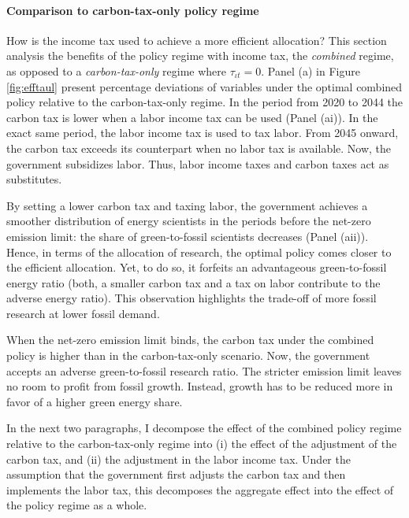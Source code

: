 \paragraph{Comparison to carbon-tax-only policy regime}
How is the income tax used to achieve a more efficient allocation?
This section analysis the benefits of the policy regime with income tax, the \textit{combined} regime, as opposed to a \textit{carbon-tax-only} regime where $\tau_{\iota t}=0$.  
Panel (a)  in Figure \ref{fig:efftaul} present percentage deviations of variables under the optimal combined policy relative to the carbon-tax-only regime. In the period from 2020 to 2044 the carbon tax is lower when a labor income tax can be used (Panel (ai)). In the exact same period, the labor income tax is used to tax labor. From 2045 onward, the carbon tax exceeds its counterpart when no labor tax is available. Now, the government subsidizes labor. Thus, labor income taxes and carbon taxes act as substitutes.

By setting a lower carbon tax and taxing labor, the government achieves a smoother distribution of energy scientists in the periods before the net-zero emission limit: the share of green-to-fossil scientists decreases (Panel (aii)). 
Hence, in terms of the allocation of research, the optimal policy comes closer to the efficient allocation. Yet, to do so, it forfeits an advantageous green-to-fossil energy ratio (both, a smaller carbon tax and a tax on labor contribute to the adverse energy ratio). This observation highlights the trade-off of more fossil research at lower fossil demand. 

When the net-zero emission limit binds, the carbon tax under the combined policy is higher than in the carbon-tax-only scenario.
Now, the government accepts an adverse green-to-fossil research ratio. The  stricter emission limit leaves no room to profit from fossil growth. Instead, growth has to be reduced more in favor of a higher green energy share. 

In the next two paragraphs, I decompose the effect of the combined policy regime relative to the carbon-tax-only regime into (i) the effect of the adjustment of the carbon tax, and (ii) the adjustment in the labor income tax. Under the assumption that the government first adjusts the carbon tax and then implements the labor tax, this decomposes the  aggregate effect into the effect of the policy regime as a whole.  

